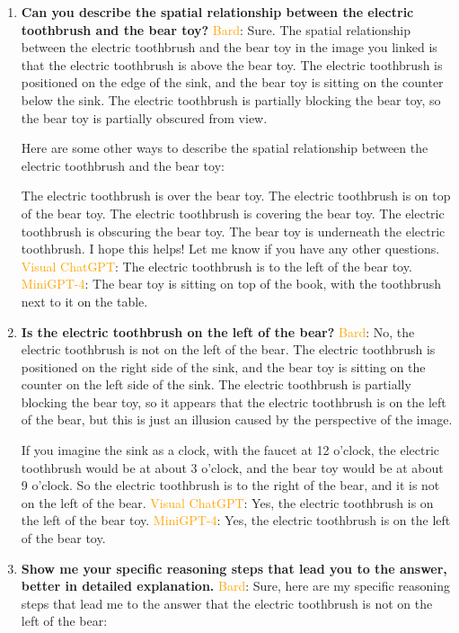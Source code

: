     \begin{enumerate}
        \item \textbf{Can you describe the spatial relationship between the electric toothbrush and the bear toy?}
        \subitem \textcolor{orange}{Bard}: Sure. The spatial relationship between the electric toothbrush and the bear toy in the image you linked is that the electric toothbrush is above the bear toy. The electric toothbrush is positioned on the edge of the sink, and the bear toy is sitting on the counter below the sink. The electric toothbrush is partially blocking the bear toy, so the bear toy is partially obscured from view.

        Here are some other ways to describe the spatial relationship between the electric toothbrush and the bear toy:
        
        The electric toothbrush is over the bear toy.
        The electric toothbrush is on top of the bear toy.
        The electric toothbrush is covering the bear toy.
        The electric toothbrush is obscuring the bear toy.
        The bear toy is underneath the electric toothbrush.
        I hope this helps! Let me know if you have any other questions.
        \subitem \textcolor{orange}{Visual ChatGPT}: The electric toothbrush is to the left of the bear toy.
        \subitem \textcolor{orange}{MiniGPT-4}: The bear toy is sitting on top of the book, with the toothbrush next to it on the table.
        \item \textbf{Is the electric toothbrush on the left of the bear?}
        \subitem \textcolor{orange}{Bard}: 
        No, the electric toothbrush is not on the left of the bear. The electric toothbrush is positioned on the right side of the sink, and the bear toy is sitting on the counter on the left side of the sink. The electric toothbrush is partially blocking the bear toy, so it appears that the electric toothbrush is on the left of the bear, but this is just an illusion caused by the perspective of the image.
        
        If you imagine the sink as a clock, with the faucet at 12 o'clock, the electric toothbrush would be at about 3 o'clock, and the bear toy would be at about 9 o'clock. So the electric toothbrush is to the right of the bear, and it is not on the left of the bear.
        \subitem \textcolor{orange}{Visual ChatGPT}: Yes, the electric toothbrush is on the left of the bear toy.
        \subitem \textcolor{orange}{MiniGPT-4}: Yes, the electric toothbrush is on the left of the bear toy.
        \item \textbf{Show me your specific reasoning steps that lead you to the answer, better in detailed explanation.}
        \subitem \textcolor{orange}{Bard}: 
        Sure, here are my specific reasoning steps that lead me to the answer that the electric toothbrush is not on the left of the bear:
        

\end{enumerate}
